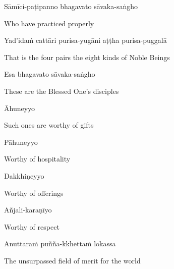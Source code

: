 Sāmīci-paṭipanno bhagavato sāvaka-saṅgho

\begin{english}
  Who have practiced properly\ifdigitalversion\makeatletter\hyperlink{endnote7-appendix}\makeatother\fi

\end{english}

Yad'idaṁ cattāri purisa-yugāni aṭṭha purisa-puggalā

\begin{english}
  That is the four pairs the eight kinds of Noble Beings
\end{english}

Esa bhagavato sāvaka-saṅgho

\begin{english}
  These are the Blessed One's disciples
\end{english}

Āhuneyyo

\begin{english}
  Such ones are worthy of gifts
\end{english}

Pāhuneyyo

\begin{english}
  Worthy of hospitality
\end{english}

\ifasixversion\clearpage\fi

Dakkhiṇeyyo

\begin{english}
  Worthy of offerings
\end{english}

Añjali-karaṇīyo

\begin{english}
  Worthy of respect
\end{english}

Anuttaraṁ puñña-kkhettaṁ lokassa

\begin{english}
  The unsurpassed field of merit for the world\ifdigitalversion\makeatletter\hyperlink{endnote149-appendix}\makeatother\fi
\end{english}

